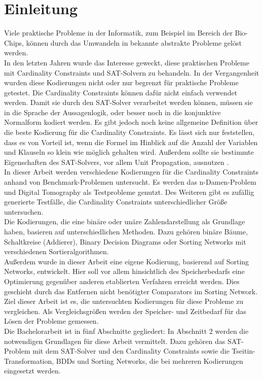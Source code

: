 \documentclass[a4,abstract=on]{scrartcl}
\newcommand*\stdsection{}
\let\stdsection\section
\renewcommand*\section{%
    \clearpage\ifodd\value{page}\else\mbox{}\clearpage\fi
    \stdsection}
\begin{document}
\section{Einleitung}
Viele praktische Probleme in der Informatik, zum Beispiel im Bereich der Bio-Chips, können durch das Umwandeln in bekannte abstrakte Probleme gelöst werden.\\
In den letzten Jahren wurde das Interesse geweckt, diese praktischen Probleme mit Cardinality Constraints und SAT-Solvern zu behandeln. In der Vergangenheit wurden diese Kodierungen nicht oder nur begrenzt für praktische Probleme getestet. Die Cardinality Constraints können dafür nicht einfach verwendet werden. Damit sie durch den SAT-Solver verarbeitet werden können, müssen sie in die Sprache der Aussagenlogik, oder besser noch in die konjunktive Normalform kodiert werden. Es gibt jedoch noch keine allgemeine Definition über die beste Kodierung für die Cardinality Constraints. Es lässt sich nur feststellen, dass es von Vorteil ist, wenn die Formel im Hinblick auf die Anzahl der Variablen und Klauseln so klein wie möglich gehalten wird. Außerdem sollte sie bestimmte Eigenschaften des SAT-Solvers, vor allem Unit Propagation, ausnutzen \cite[vgl.][]{einleitung}.\\
In dieser Arbeit werden verschiedene Kodierungen für die Cardinality Constraints anhand von Benchmark-Problemen untersucht. Es werden das n-Damen-Problem und Digital Tomography als Testprobleme genutzt. Des Weiteren gibt es zufällig generierte Testfälle, die Cardinality Constraints unterschiedlicher Größe untersuchen. \\
Die Kodierungen, die eine binäre oder unäre Zahlendarstellung als Grundlage haben, basieren auf unterschiedlichen Methoden. Dazu gehören binäre Bäume, Schaltkreise (Addierer), Binary Decision Diagrams oder Sorting Networks mit verschiedenen Sortieralgorithmen. \\
Außerdem wurde in dieser Arbeit eine eigene Kodierung, basierend auf Sorting Networks, entwickelt. Hier soll vor allem hinsichtlich des Speicherbedarfs eine Optimierung gegenüber anderen etablierten Verfahren erreicht werden. Dies geschieht durch das Entfernen nicht benötigter Comparators im Sorting Network. \\
Ziel dieser Arbeit ist es, die untersuchten Kodierungen für diese Probleme zu vergleichen. Als Vergleichsgrößen werden der Speicher- und Zeitbedarf für das Lösen der Probleme gemessen. \\
\newline
Die Bachelorarbeit ist in fünf Abschnitte gegliedert: In Abschnitt $2$ werden die notwendigen Grundlagen für diese Arbeit vermittelt. Dazu gehören das SAT-Problem mit dem SAT-Solver und den Cardinality Constraints sowie die Tseitin-Transformation, BDDs und Sorting Networks, die bei mehreren Kodierungen eingesetzt werden.\\
\end{document}
